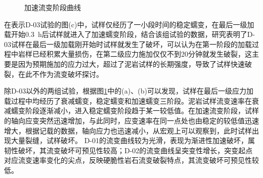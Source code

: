 \begin{figure}[ht!]
    \centering
    \centering
    \caption{加速流变阶段曲线}
    \label{fig:2-13}
\end{figure}

在表示D-03试验的图(c)中，试样仅经历了一小段时间的稳定蠕变，在最后一级加载开始\SI{0.3}{h}后试样就进入了加速蠕变阶段，结合该组试验的数据，研究表明了D-03试样在最后一级加载刚开始时试样就发生了破坏，可以认为在第一阶段的加载过程中岩样已经积累大量损伤，在第二级应力施加仅仅不到20分钟就发生破裂，这主要是因为预期施加的应力过大，超过了泥岩试样的长期强度，导致了试样快速破裂，在此不作为流变破坏探讨。

除D-03以外的两组试验，根据图\ref{fig:2-13}中的(a)、(b)可以发现，试样在最后一级应力加载过程中均经历了衰减蠕变，稳定蠕变和加速蠕变三阶段。泥岩试样流变速率在衰减蠕变阶段逐渐减小，进入稳定蠕变阶段趋于某一较低值。在加速流变阶段，试样的轴向应变突然迅速增加，与此同时，应变速率在同一点处也由稳定的较低值迅速增大，根据记载的数据，轴向应力也迅速减小，从宏观上可以观察到，此时试样出现大量裂缝，试样破坏。
D-01的流变曲线较为光滑，表现为渐进性加速破坏，属韧性破坏，其流变破坏可预见性较高；D-02的流变曲线呈突变性增长，突变起点对应流变速率变化的尖点，反映硬脆性岩石流变破裂特点，其流变破坏可预见性较低。


